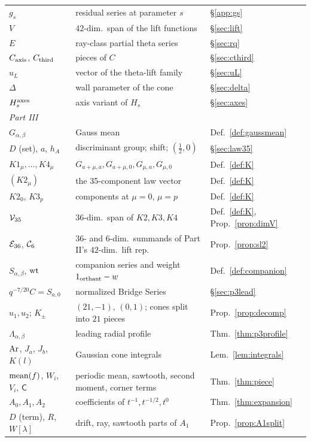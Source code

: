 \begin{center}
\begin{longtable}{p{3.2cm}p{9.3cm}p{2.4cm}}
$g_s$ & residual series at parameter $s$ & \S\ref{app:gs}\\
$V$ & $42$-dim.\ span of the lift functions & \S\ref{sec:lift}\\
$E$ & ray-class partial theta series & \S\ref{sec:rq}\\
$C_{\mathrm{axis}}$, $C_{\mathrm{third}}$ & pieces of $C$ & \S\ref{sec:cthird}\\
$u_L$ & vector of the theta-lift family & \S\ref{sec:uL}\\
$\Delta$ & wall parameter of the cone & \S\ref{sec:delta}\\
$H_s^{\rm axes}$ & axis variant of $H_s$ & \S\ref{sec:axes}\\
\multicolumn{3}{l}{\emph{Part III}}\\
$G_{\alpha,\beta}$ & Gauss mean & Def.~\ref{def:gaussmean}\\
$D$ (set), $a$, $h_A$ & discriminant group; shift; $(\frac12,0)$ & \S\ref{sec:law35}\\
$K1_\mu,\dots,K4_\mu$ & $G_{a+\mu,a},G_{a+\mu,0},G_{\mu,a},G_{\mu,0}$ & Def.~\ref{def:K}\\
$(K2_\mu)$ & the 35-component law vector & Def.~\ref{def:K}\\
$K2_0$, $K3_p$ & components at $\mu=0$, $\mu=p$ & Def.~\ref{def:K}\\
$\mathcal V_{35}$ & $36$-dim.\ span of $K2,K3,K4$ & Def.~\ref{def:K}, Prop.~\ref{prop:dimV}\\
$\mathcal E_{36}$, $\mathcal C_{6}$ & $36$- and $6$-dim.\ summands of Part II's $42$-dim.\ lift rep. & Prop.~\ref{prop:sl2}\\
$S_{\alpha,\beta}$, $\operatorname{wt}$ & companion series and weight $1_{\rm orthant}-w$ & Def.~\ref{def:companion}\\
$q^{-7/20}C=S_{a,0}$ & normalized Bridge Series & \S\ref{sec:p3lead}\\
$u_1,u_2$; $K_\pm$ & $(21,-1)$, $(0,1)$; cones split into $21$ pieces & Prop.~\ref{prop:decomp}\\
$\Lambda_{\alpha,\beta}$ & leading radial profile & Thm.~\ref{thm:p3profile}\\
$\mathrm{Ar}$, $J_a$, $J_b$, $K(l)$ & Gaussian cone integrals & Lem.~\ref{lem:integrals}\\
$\operatorname{mean}(f)$, $W_i$, $V_i$, $\mathsf C$ & periodic mean, sawtooth, second moment, corner terms & Thm.~\ref{thm:piece}\\
$A_0,A_1,A_2$ & coefficients of $t^{-1},t^{-1/2},t^0$ & Thm.~\ref{thm:expansion}\\
$D$ (term), $R$, $W[\lambda]$ & drift, ray, sawtooth parts of $A_1$ & Prop.~\ref{prop:A1split}\\

\end{longtable}
\end{center}
